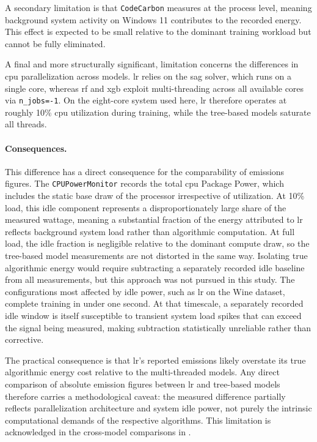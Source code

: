 A secondary limitation is that \texttt{CodeCarbon} measures at the process level, meaning background system activity on Windows 11 contributes to the recorded energy. This effect is expected to be small relative to the dominant training workload but cannot be fully eliminated.

A final and more structurally significant, limitation concerns the differences in \gls{cpu} parallelization across models. \gls{lr} relies on the \gls{sag} solver, which runs on a single core, whereas \gls{rf} and \gls{xgb} exploit multi-threading across all available cores via \texttt{n\_jobs=-1}. On the eight-core system used here, \gls{lr} therefore operates at roughly 10\% \gls{cpu} utilization during training, while the tree-based models saturate all threads.

\paragraph{Consequences.}
This difference has a direct consequence for the comparability of emissions figures. The \texttt{CPUPowerMonitor} records the total \gls{cpu} Package Power, which includes the static base draw of the processor irrespective of utilization. At 10\% load, this idle component represents a disproportionately large share of the measured wattage, meaning a substantial fraction of the energy attributed to \gls{lr} reflects background system load rather than algorithmic computation. At full load, the idle fraction is negligible relative to the dominant compute draw, so the tree-based model measurements are not distorted in the same way. Isolating true algorithmic energy would require subtracting a separately recorded idle baseline from all measurements, but this approach was not pursued in this study. The configurations most affected by idle power, such as \gls{lr} on the Wine dataset, complete training in under one second. At that timescale, a separately recorded idle window is itself susceptible to transient system load spikes that can exceed the signal being measured, making subtraction statistically unreliable rather than corrective.

The practical consequence is that \gls{lr}'s reported emissions likely overstate its true algorithmic energy cost relative to the multi-threaded models. Any direct comparison of absolute emission figures between \gls{lr} and tree-based models therefore carries a methodological caveat: the measured difference partially reflects parallelization architecture and system idle power, not purely the intrinsic computational demands of the respective algorithms. This limitation is acknowledged in the cross-model comparisons in .

